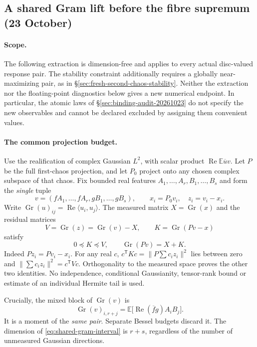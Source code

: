 \subsection{A shared Gram lift before the fibre supremum (23 October)}
\label{sec:shared-response-gram-lift}

\paragraph{Scope.}
The following extraction is dimension-free and applies to every actual
disc-valued response pair. The stability constraint additionally requires a
globally near-maximizing pair, as in
\S\ref{sec:fresh-second-chaos-stability}. Neither the extraction nor the
floating-point diagnostics below gives a new numerical endpoint. In particular,
the atomic laws of \S\ref{sec:binding-audit-20261023} do not specify the new
observables and cannot be declared excluded by assigning them convenient values.

\paragraph{The common projection budget.}
Use the realification of complex Gaussian $L^2$, with scalar product
$\operatorname{Re}\mathbb E\overline u v$. Let $P$ be the full first-chaos
projection, and let $P_0$ project onto any chosen complex subspace of that
chaos. Fix bounded real features $A_1,\ldots,A_r,B_1,\ldots,B_s$ and form the
\emph{single} tuple
\[
 v=(fA_1,\ldots,fA_r,gB_1,\ldots,gB_s),\qquad
 x_i=P_0v_i,\quad z_i=v_i-x_i.
\]
Write $\operatorname{Gr}(u)_{ij}=\operatorname{Re}\langle u_i,u_j\rangle$.
The measured matrix $X=\operatorname{Gr}(x)$ and the residual matrices
\[
 V=\operatorname{Gr}(z)=\operatorname{Gr}(v)-X,\qquad
 K=\operatorname{Gr}(Pv-x)
\]
satisfy
\begin{equation}\label{eq:shared-gram-interval}
 \boxed{0\preceq K\preceq V,\qquad
       \operatorname{Gr}(Pv)=X+K.}
\end{equation}
Indeed $Pz_i=Pv_i-x_i$. For any real $c$,
$c^{\mathsf T}Kc=\|P\sum c_i z_i\|^2$ lies between zero and
$\|\sum c_i z_i\|^2=c^{\mathsf T}Vc$. Orthogonality to the measured
space proves the other two identities. No independence, conditional
Gaussianity, tensor-rank bound or estimate of an individual Hermite tail is used.

Crucially, the mixed block of $\operatorname{Gr}(v)$ is
\[
 \operatorname{Gr}(v)_{i,r+j}
   =\mathbb E\bigl[\operatorname{Re}(\overline f g)A_iB_j\bigr].
\]
It is a moment of the \emph{same pair}. Separate Bessel budgets discard it.
The dimension of \eqref{eq:shared-gram-interval} is $r+s$, regardless of the
number of unmeasured Gaussian directions.

